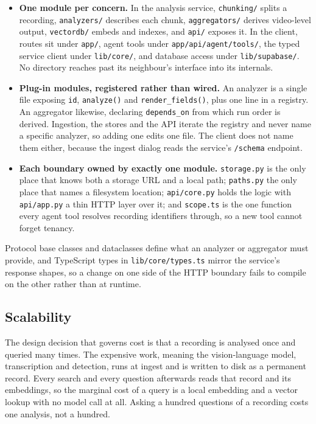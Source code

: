 \documentclass[11pt,a4paper]{article}
\begin{document}
\begin{itemize}
  \item \textbf{One module per concern.} In the analysis service,
        \texttt{chunking/} splits a recording, \texttt{analyzers/} describes each
        chunk, \texttt{aggregators/} derives video-level output,
        \texttt{vectordb/} embeds and indexes, and \texttt{api/} exposes it. In
        the client, routes sit under \texttt{app/}, agent tools under
        \texttt{app/api/agent/tools/}, the typed service client under
        \texttt{lib/core/}, and database access under \texttt{lib/supabase/}. No
        directory reaches past its neighbour's interface into its internals.
  \item \textbf{Plug-in modules, registered rather than wired.} An analyzer is a
        single file exposing \texttt{id}, \texttt{analyze()} and
        \texttt{render\_fields()}, plus one line in a registry. An aggregator
        likewise, declaring \texttt{depends\_on} from which run order is derived.
        Ingestion, the stores and the API iterate the registry and never name a
        specific analyzer, so adding one edits one file. The client does not name
        them either, because the ingest dialog reads the service's
        \texttt{/schema} endpoint.
  \item \textbf{Each boundary owned by exactly one module.}
        \texttt{storage.py} is the only place that knows both a storage URL and a
        local path; \texttt{paths.py} the only place that names a filesystem
        location; \texttt{api/core.py} holds the logic with \texttt{api/app.py} a
        thin HTTP layer over it; and \texttt{scope.ts} is the one function every
        agent tool resolves recording identifiers through, so a new tool cannot
        forget tenancy.
\end{itemize}

Protocol base classes and dataclasses define what an analyzer or aggregator must
provide, and TypeScript types in \texttt{lib/core/types.ts} mirror the service's
response shapes, so a change on one side of the HTTP boundary fails to compile
on the other rather than at runtime.

\subsection{Scalability}

The design decision that governs cost is that a recording is analysed once and
queried many times. The expensive work, meaning the vision-language model,
transcription and detection, runs at ingest and is written to disk as a permanent
record. Every search and every question afterwards reads that record and its
embeddings, so the marginal cost of a query is a local embedding and a vector
lookup with no model call at all. Asking a hundred questions of a recording costs
one analysis, not a hundred.
\end{document}
